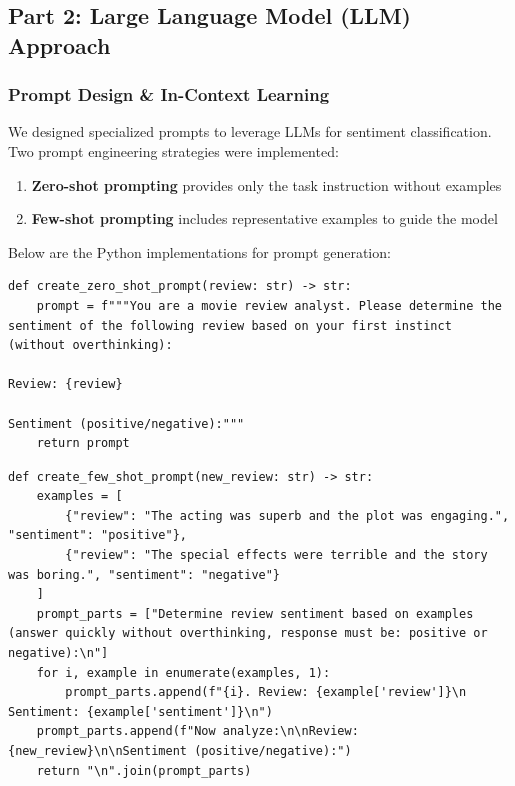\documentclass{article}
\begin{document}
\subsection{Part 2: Large Language Model (LLM) Approach}
\label{ssec:llm_approach}

\subsubsection{Prompt Design \& In-Context Learning}
\label{sssec:prompt_design}

We designed specialized prompts to leverage LLMs for sentiment classification. Two prompt engineering strategies were implemented:

\begin{enumerate}
    \item \textbf{Zero-shot prompting} provides only the task instruction without examples
    \item \textbf{Few-shot prompting} includes representative examples to guide the model
\end{enumerate}

Below are the Python implementations for prompt generation:

\begin{lstlisting}[caption={Zero-shot prompt design}]
def create_zero_shot_prompt(review: str) -> str:
    prompt = f"""You are a movie review analyst. Please determine the sentiment of the following review based on your first instinct (without overthinking):

Review: {review}

Sentiment (positive/negative):"""
    return prompt
\end{lstlisting}

\begin{lstlisting}[caption={Few-shot prompt design}]
def create_few_shot_prompt(new_review: str) -> str:
    examples = [
        {"review": "The acting was superb and the plot was engaging.", "sentiment": "positive"},
        {"review": "The special effects were terrible and the story was boring.", "sentiment": "negative"}
    ]
    prompt_parts = ["Determine review sentiment based on examples (answer quickly without overthinking, response must be: positive or negative):\n"]
    for i, example in enumerate(examples, 1):
        prompt_parts.append(f"{i}. Review: {example['review']}\n   Sentiment: {example['sentiment']}\n")
    prompt_parts.append(f"Now analyze:\n\nReview: {new_review}\n\nSentiment (positive/negative):")
    return "\n".join(prompt_parts)
\end{lstlisting}
\end{document}
